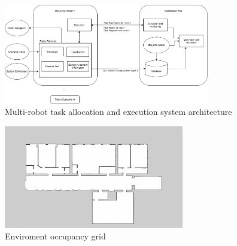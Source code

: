 \begin{figure}[htbp]
	\centering
	\includegraphics[width = 0.8\textwidth]{content/images/ch3/architecture.drawio.png}
	\caption{Multi-robot task allocation and execution system architecture}
	\label{fig:system_architecture}
\end{figure}

\begin{figure}[htbp]
	\centering
	\includegraphics[width = 0.7\textwidth]{content/images/ch3/occupancy_grid.png}
	\caption{Enviroment occupancy grid}
	\label{fig:occupancy_grid}
\end{figure}

